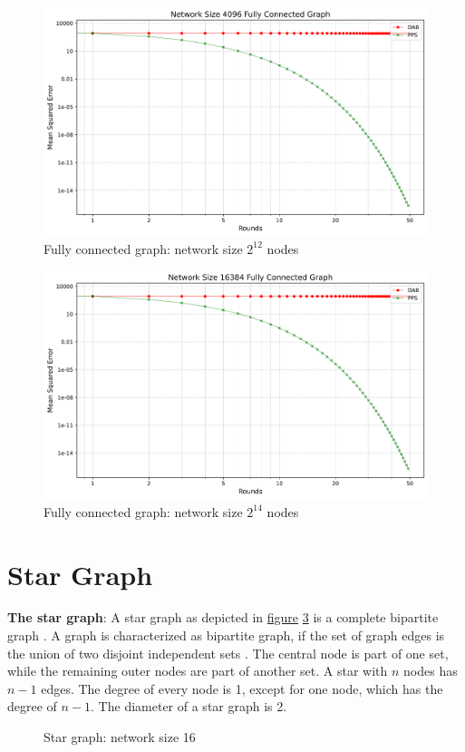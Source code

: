 \begin{figure}[H]
    \centering
    \includegraphics[scale=0.5]{figures/completeGraphSimulations/DAB_vs_PPS_FCG_r50_n4096.png}
    \caption{Fully connected graph: network size $2^{12}$ nodes}
    \label{fig:4096CompleteGraph}
\end{figure}
\begin{figure}[H]
    \centering
    \includegraphics[scale=0.5]{figures/completeGraphSimulations/DAB_vs_PPS_FCG_r50_n16384.png}
    \caption{Fully connected graph: network size $2^{14}$ nodes}
    \label{fig:16384CompleteGraph}
\end{figure}


\section{Star Graph}
\textbf{The star graph}: A star graph as depicted in \hyperref[fig:stargraphDemo]{figure} \ref{fig:stargraphDemo} is a complete bipartite graph \cite{west2001introduction}. A graph is characterized as bipartite graph, if the set of graph edges is the union of two disjoint independent sets \cite{GraphTheorySchindelhaauer2021}. The central node is part of one set, while the remaining outer nodes are part of another set. A star with $n$ nodes has $n-1$ edges. The degree of every node is 1, except for one node, which has the degree of $n-1$. The diameter of a star graph is 2.
\begin{figure}
    \centering
    
    \caption{Star graph: network size 16}
    \label{fig:stargraphDemo}
\end{figure}
